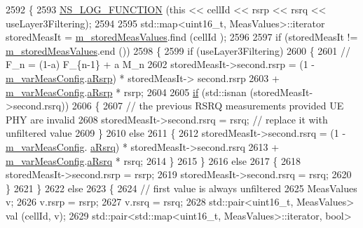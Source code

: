 \begin{DoxyCode}
2592 \{
2593   \hyperlink{log-macros-disabled_8h_a90b90d5bad1f39cb1b64923ea94c0761}{NS\_LOG\_FUNCTION} (\textcolor{keyword}{this} << cellId << rsrp << rsrq << useLayer3Filtering);
2594 
2595   std::map<uint16\_t, MeasValues>::iterator storedMeasIt = \hyperlink{classns3_1_1LteUeRrc_a93094dcd5c235b2e2a8a299125100a57}{m\_storedMeasValues}.find (cellId
      );
2596 
2597   \textcolor{keywordflow}{if} (storedMeasIt != \hyperlink{classns3_1_1LteUeRrc_a93094dcd5c235b2e2a8a299125100a57}{m\_storedMeasValues}.end ())
2598     \{
2599       \textcolor{keywordflow}{if} (useLayer3Filtering)
2600         \{
2601           \textcolor{comment}{// F\_n = (1-a) F\_\{n-1\} + a M\_n}
2602           storedMeasIt->second.rsrp = (1 - \hyperlink{classns3_1_1LteUeRrc_a27a7773eedfdab964d2514d9eeb1c562}{m\_varMeasConfig}.\hyperlink{structns3_1_1LteUeRrc_1_1VarMeasConfig_ae27b8f0c85f0d02a4d9ee4a397806bff}{aRsrp}) * storedMeasIt->
      second.rsrp
2603             + \hyperlink{classns3_1_1LteUeRrc_a27a7773eedfdab964d2514d9eeb1c562}{m\_varMeasConfig}.\hyperlink{structns3_1_1LteUeRrc_1_1VarMeasConfig_ae27b8f0c85f0d02a4d9ee4a397806bff}{aRsrp} * rsrp;
2604 
2605           \hyperlink{loss__ITU1238_8m_a419d895abe1313c35fa353c93802647e}{if} (std::isnan (storedMeasIt->second.rsrq))
2606             \{
2607               \textcolor{comment}{// the previous RSRQ measurements provided UE PHY are invalid}
2608               storedMeasIt->second.rsrq = rsrq; \textcolor{comment}{// replace it with unfiltered value}
2609             \}
2610           \textcolor{keywordflow}{else}
2611             \{
2612               storedMeasIt->second.rsrq = (1 - \hyperlink{classns3_1_1LteUeRrc_a27a7773eedfdab964d2514d9eeb1c562}{m\_varMeasConfig}.
      \hyperlink{structns3_1_1LteUeRrc_1_1VarMeasConfig_a3b110446d230054a65aeeeff4fda2fe3}{aRsrq}) * storedMeasIt->second.rsrq
2613                 + \hyperlink{classns3_1_1LteUeRrc_a27a7773eedfdab964d2514d9eeb1c562}{m\_varMeasConfig}.\hyperlink{structns3_1_1LteUeRrc_1_1VarMeasConfig_a3b110446d230054a65aeeeff4fda2fe3}{aRsrq} * rsrq;
2614             \}
2615         \}
2616       \textcolor{keywordflow}{else}
2617         \{
2618           storedMeasIt->second.rsrp = rsrp;
2619           storedMeasIt->second.rsrq = rsrq;
2620         \}
2621     \}
2622   \textcolor{keywordflow}{else}
2623     \{
2624       \textcolor{comment}{// first value is always unfiltered}
2625       MeasValues v;
2626       v.rsrp = rsrp;
2627       v.rsrq = rsrq;
2628       std::pair<uint16\_t, MeasValues> val (cellId, v);
2629       std::pair<std::map<uint16\_t, MeasValues>::iterator, \textcolor{keywordtype}{bool}>

\end{DoxyCode}
